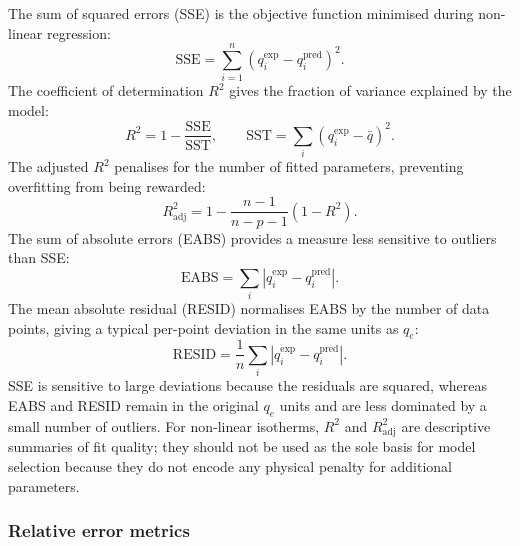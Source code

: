 \documentclass[journal=jacsat,manuscript=article]{achemso}
\begin{document}
The sum of squared errors (SSE) is the objective function minimised
during non-linear regression:
\begin{equation}
	\text{SSE} = \sum_{i=1}^{n}(q_i^{\exp} - q_i^{\mathrm{pred}})^2.
	\label{eq:si_SSE}
\end{equation}
The coefficient of determination $R^2$ gives the fraction of variance
explained by the model:
\begin{equation}
	R^2 = 1 - \frac{\mathrm{SSE}}{\mathrm{SST}},
	\qquad \mathrm{SST} = \sum_{i}(q_i^{\exp} - \bar{q})^2.
	\label{eq:si_R2}
\end{equation}
The adjusted $R^2$ penalises for the number of fitted parameters,
preventing overfitting from being rewarded:
\begin{equation}
	R^2_{\mathrm{adj}} = 1 - \frac{n-1}{n-p-1}(1-R^2).
	\label{eq:si_R2adj}
\end{equation}
The sum of absolute errors (EABS) provides a measure less sensitive
to outliers than SSE:
\begin{equation}
	\text{EABS} = \sum_{i}|q_i^{\exp} - q_i^{\mathrm{pred}}|.
	\label{eq:si_EABS}
\end{equation}
The mean absolute residual (RESID) normalises EABS by the number of
data points, giving a typical per-point deviation in the same units
as $q_e$:
\begin{equation}
	\text{RESID} = \frac{1}{n}\sum_{i}|q_i^{\exp} - q_i^{\mathrm{pred}}|.
	\label{eq:si_RESID}
\end{equation}
SSE is sensitive to large deviations because the residuals are squared,
whereas EABS and RESID remain in the original $q_e$ units and are less
dominated by a small number of outliers. For non-linear isotherms,
$R^2$ and $R^2_{\mathrm{adj}}$ are descriptive summaries of fit quality;
they should not be used as the sole basis for model selection because
they do not encode any physical penalty for additional parameters.

\subsubsection{Relative error metrics}
\end{document}
